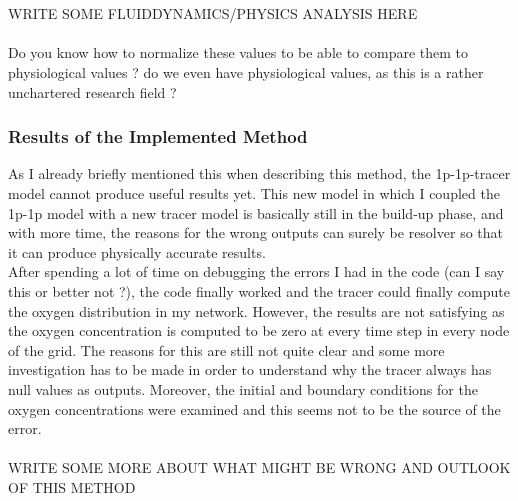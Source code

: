 \\
\\ WRITE SOME FLUIDDYNAMICS/PHYSICS ANALYSIS HERE
\\
\\{\color{red} Do you know how to normalize these values to be able to compare them to physiological values ? do we even have physiological values, as this is a rather unchartered research field ?}

\subsubsection*{Results of the Implemented Method}

As I already briefly mentioned this when describing this method, the 1p-1p-tracer model cannot produce useful results yet. This new model in which I coupled the 1p-1p model with a new tracer model is basically still in the build-up phase, and with more time, the reasons for the wrong outputs can surely be resolver so that it can produce physically accurate results.
\\After spending a lot of time on debugging the errors I had in the code {\color{red} (can I say this or better not ?)}, the code finally worked and the tracer could finally compute the oxygen distribution in my network. However, the results are not satisfying as the oxygen concentration is computed to be zero at every time step in every node of the grid. The reasons for this are still not quite clear and some more investigation has to be made in order to understand why the tracer always has null values as outputs. Moreover, the initial and boundary conditions for the oxygen concentrations were examined and this seems not to be the source of the error.
\\
\\WRITE SOME MORE ABOUT WHAT MIGHT BE WRONG AND OUTLOOK OF THIS METHOD
\\
\\

\newpage
